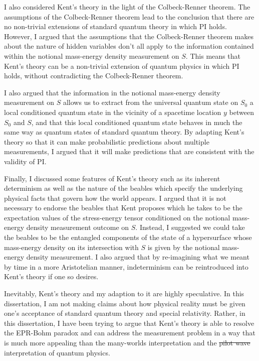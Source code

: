 \documentclass[12pt]{report}
\providecommand{\DIFadd}[1]{{\protect\color{blue}\uwave{#1}}} %
\providecommand{\DIFdel}[1]{{\protect\color{red}\sout{#1}}}                      %
\providecommand{\DIFaddbegin}{} %
\providecommand{\DIFaddend}{} %
\providecommand{\DIFdelbegin}{} %
\providecommand{\DIFdelend}{} %
\begin{document}
I also considered Kent's theory in the light of the Colbeck-Renner theorem. The assumptions of the Colbeck-Renner theorem lead to the conclusion that there are no non-trivial extensions of standard quantum theory in which PI holds. However, I argued that the assumptions that the Colbeck-Renner theorem makes about the nature of hidden variables don't all apply to the information contained within the notional mass-energy density measurement on $S$. This means that Kent's theory can be a non-trivial extension of quantum physics in which PI holds, without contradicting the Colbeck-Renner theorem. 

I also argued that the information in the notional mass-energy density measurement on $S$ allows us to extract from the universal quantum state on $S_0$ a local conditioned quantum state in the vicinity of a spacetime location $y$ between $S_0$ and $S$, and that this local conditioned quantum state behaves in much the same way as quantum states of standard quantum theory. By adapting Kent's theory so that it can make probabilistic predictions about multiple measurements, I argued that it will make predictions that are consistent with the validity of PI. 

Finally, I discussed some features of Kent's theory such as its inherent determinism as well as the nature of the beables which specify the underlying physical facts that govern how the world appears. I argued that it is not necessary to endorse the beables that Kent proposes which he takes to be the expectation values of the stress-energy tensor conditioned on the notional mass-energy density measurement outcome on $S$. Instead, I suggested we could take the beables to be the entangled components of the state of a hypersurface whose mass-energy density on its intersection with $S$ is given by the notional mass-energy density measurement. I also argued that by re-imagining what we meant by time in a more Aristotelian manner, indeterminism can be reintroduced into Kent's theory if one so desires. 

Inevitably, Kent's theory and my adaption to it are highly speculative. In this dissertation, I am not making claims about how physical reality must be given one's acceptance of standard quantum theory and special relativity. Rather, in this dissertation, I have been trying to argue that Kent's theory is able to resolve the EPR-Bohm paradox and can address the measurement problem in a way that is much more appealing than the many-worlds interpretation and the \DIFdelbegin \DIFdel{pilot wave }\DIFdelend \DIFaddbegin \DIFadd{Bohmian }\DIFaddend interpretation of quantum physics.


\pagebreak
{} 
\printbibliography

\pagebreak
{}

\singlespacing 

\printnomenclature[3.7cm]


\printindex 
\end{document}
